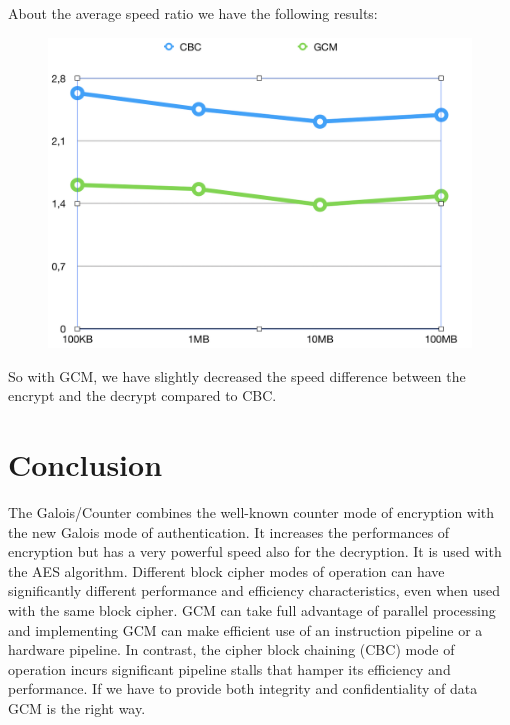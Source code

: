 \documentclass[11pt]{article}
\begin{document}
About the average speed ratio we have the following results:

\begin{figure}[hbt!]
  \centering
  \includegraphics[width=.8\textwidth]{pic7-hw3-1635747}
  \label{fig:speed ratio}
\end{figure}

So with GCM, we have slightly decreased the speed difference between the encrypt and the decrypt compared to CBC.

\section{Conclusion}
The Galois/Counter combines the well-known counter mode of encryption with the new Galois mode of authentication. It increases the performances of encryption but has a very powerful speed also for the decryption. It is used with the AES algorithm. Different block cipher modes of operation can have significantly different performance and efficiency characteristics, even when used with the same block cipher. GCM can take full advantage of parallel processing and implementing GCM can make efficient use of an instruction pipeline or a hardware pipeline. In contrast, the cipher block chaining (CBC) mode of operation incurs significant pipeline stalls that hamper its efficiency and performance. If we have to provide both integrity and confidentiality of data GCM is the right way.
\end{document}
